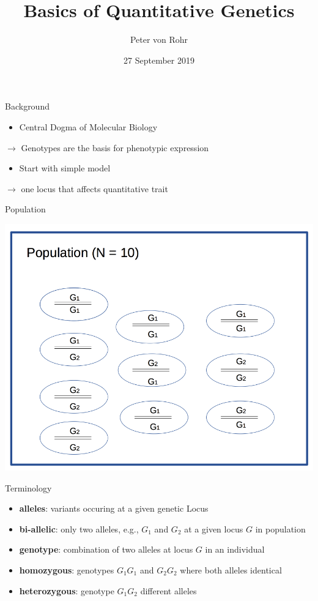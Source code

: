 \documentclass[ignorenonframetext,]{beamer}
\title{Basics of Quantitative Genetics}
\author{Peter von Rohr}
\date{27 September 2019}
\providecommand{\tightlist}{%
  \setlength{\itemsep}{0pt}\setlength{\parskip}{0pt}}
\begin{document}
\frame{\titlepage}

\begin{frame}{Background}
\protect\hypertarget{background}{}

\begin{itemize}
\tightlist
\item
  Central Dogma of Molecular Biology
\end{itemize}

\(\rightarrow\) Genotypes are the basis for phenotypic expression

\begin{itemize}
\tightlist
\item
  Start with simple model
\end{itemize}

\(\rightarrow\) one locus that affects quantitative trait

\end{frame}

\begin{frame}{Population}
\protect\hypertarget{population}{}

\includegraphics{odg/idealpopsingletrait.png}

\end{frame}

\begin{frame}{Terminology}
\protect\hypertarget{terminology}{}

\begin{itemize}
\tightlist
\item
  \textbf{alleles}: variants occuring at a given genetic Locus
\item
  \textbf{bi-allelic}: only two alleles, e.g., \(G_1\) and \(G_2\) at a
  given locus \(G\) in population
\item
  \textbf{genotype}: combination of two alleles at locus \(G\) in an
  individual
\item
  \textbf{homozygous}: genotypes \(G_1G_1\) and \(G_2G_2\) where both
  alleles identical
\item
  \textbf{heterozygous}: genotype \(G_1G_2\) different alleles
\end{itemize}

\end{frame}
\end{document}
